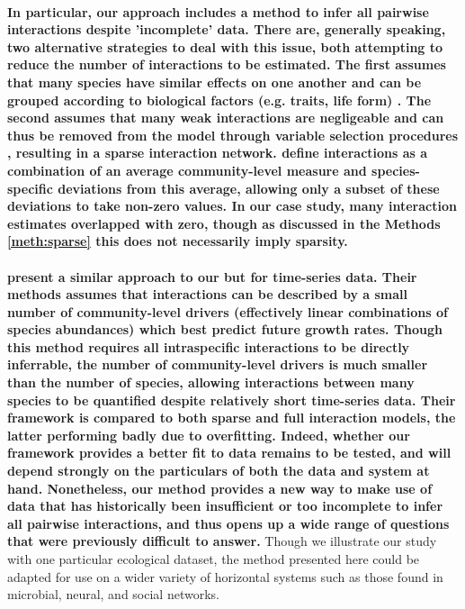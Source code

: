 \documentclass[a4,12pt]{article}
\begin{document}
\begin{refsection}
    \paragraph{}
    \textbf{In particular, our approach includes a method to infer all pairwise interactions despite 'incomplete' data. There are, generally speaking, two alternative strategies to deal with this issue, both attempting to reduce the number of interactions to be estimated. The first assumes that many species have similar effects on one another and can be grouped according to biological factors (e.g. traits, life form) \parencite{Uriarte2004, Martyn2020}. The second assumes that many weak interactions are negligeable and can thus be removed from the model through variable selection procedures \parencite{Mutshinda2009, Weiss-Lehman2022}, resulting in a sparse interaction network. \textcite{Weiss-Lehman2022} define interactions as a combination of an average community-level measure and species-specific deviations from this average, allowing only a subset of these deviations to take non-zero values. In our case study, many interaction estimates overlapped with zero, though as discussed in the Methods \ref{meth:sparse} this does not necessarily imply sparsity.}

    \paragraph{}
    \textbf{\textcite{Ovaskainen2017} present a similar approach to our but for time-series data. Their methods assumes that interactions can be described by a small number of community-level drivers (effectively linear combinations of species abundances) which best predict future growth rates. Though this method requires all intraspecific interactions to be directly inferrable, the number of community-level drivers is much smaller than the number of species, allowing interactions between many species to be quantified despite relatively short time-series data. Their framework is compared to both sparse and full interaction models, the latter performing badly due to overfitting. Indeed, whether our framework provides a better fit to data remains to be tested, and will depend strongly on the particulars of both the data and system at hand. Nonetheless, our method provides a new way to make use of data that has historically been insufficient or too incomplete to infer all pairwise interactions, and thus opens up a wide range of questions that were previously difficult to answer.} Though we illustrate our study with one particular ecological dataset, the method presented here could be adapted for use on a wider variety of horizontal systems such as those found in microbial, neural, and social networks. 


\end{refsection}
\end{document}
